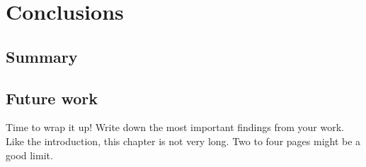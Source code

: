 \chapter{Conclusions}
\label{chapter:conclusions}

\section{Summary}

\section{Future work}
Time to wrap it up! 
Write down the most important findings from your work. 
Like the introduction, this chapter is not very long.
Two to four pages might be a good limit. 


